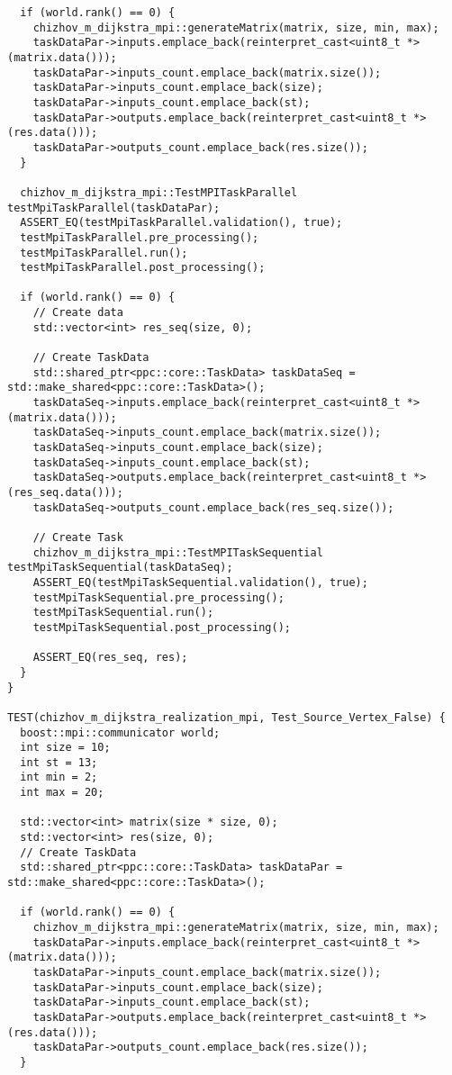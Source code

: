 \documentclass[a4paper, 14pt]{extarticle}
\begin{document}
\begin{lstlisting}
  if (world.rank() == 0) {
    chizhov_m_dijkstra_mpi::generateMatrix(matrix, size, min, max);
    taskDataPar->inputs.emplace_back(reinterpret_cast<uint8_t *>(matrix.data()));
    taskDataPar->inputs_count.emplace_back(matrix.size());
    taskDataPar->inputs_count.emplace_back(size);
    taskDataPar->inputs_count.emplace_back(st);
    taskDataPar->outputs.emplace_back(reinterpret_cast<uint8_t *>(res.data()));
    taskDataPar->outputs_count.emplace_back(res.size());
  }

  chizhov_m_dijkstra_mpi::TestMPITaskParallel testMpiTaskParallel(taskDataPar);
  ASSERT_EQ(testMpiTaskParallel.validation(), true);
  testMpiTaskParallel.pre_processing();
  testMpiTaskParallel.run();
  testMpiTaskParallel.post_processing();

  if (world.rank() == 0) {
    // Create data
    std::vector<int> res_seq(size, 0);

    // Create TaskData
    std::shared_ptr<ppc::core::TaskData> taskDataSeq = std::make_shared<ppc::core::TaskData>();
    taskDataSeq->inputs.emplace_back(reinterpret_cast<uint8_t *>(matrix.data()));
    taskDataSeq->inputs_count.emplace_back(matrix.size());
    taskDataSeq->inputs_count.emplace_back(size);
    taskDataSeq->inputs_count.emplace_back(st);
    taskDataSeq->outputs.emplace_back(reinterpret_cast<uint8_t *>(res_seq.data()));
    taskDataSeq->outputs_count.emplace_back(res_seq.size());

    // Create Task
    chizhov_m_dijkstra_mpi::TestMPITaskSequential testMpiTaskSequential(taskDataSeq);
    ASSERT_EQ(testMpiTaskSequential.validation(), true);
    testMpiTaskSequential.pre_processing();
    testMpiTaskSequential.run();
    testMpiTaskSequential.post_processing();

    ASSERT_EQ(res_seq, res);
  }
}

TEST(chizhov_m_dijkstra_realization_mpi, Test_Source_Vertex_False) {
  boost::mpi::communicator world;
  int size = 10;
  int st = 13;
  int min = 2;
  int max = 20;

  std::vector<int> matrix(size * size, 0);
  std::vector<int> res(size, 0);
  // Create TaskData
  std::shared_ptr<ppc::core::TaskData> taskDataPar = std::make_shared<ppc::core::TaskData>();

  if (world.rank() == 0) {
    chizhov_m_dijkstra_mpi::generateMatrix(matrix, size, min, max);
    taskDataPar->inputs.emplace_back(reinterpret_cast<uint8_t *>(matrix.data()));
    taskDataPar->inputs_count.emplace_back(matrix.size());
    taskDataPar->inputs_count.emplace_back(size);
    taskDataPar->inputs_count.emplace_back(st);
    taskDataPar->outputs.emplace_back(reinterpret_cast<uint8_t *>(res.data()));
    taskDataPar->outputs_count.emplace_back(res.size());
  }


\end{lstlisting}
\end{document}
